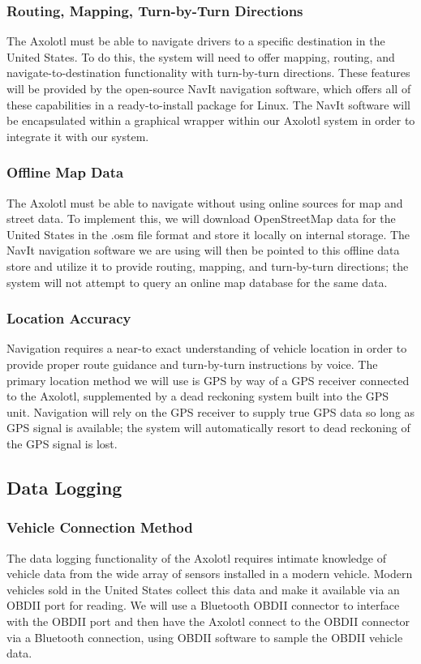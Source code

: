 \documentclass[onecolumn, draftclsnofoot,10pt, compsoc]{IEEEtran}
\begin{document}
\subsubsection{Routing, Mapping, Turn-by-Turn Directions}
The Axolotl must be able to navigate drivers to a specific destination in the United States. To do this, the system will need to offer mapping, routing, and navigate-to-destination functionality with turn-by-turn directions. These features will be provided by the open-source NavIt navigation software, which offers all of these capabilities in a ready-to-install package for Linux. The NavIt software will be encapsulated within a graphical wrapper within our Axolotl system in order to integrate it with our system.

\subsubsection{Offline Map Data}
The Axolotl must be able to navigate without using online sources for map and street data. To implement this, we will download OpenStreetMap data for the United States in the .osm file format and store it locally on internal storage. The NavIt navigation software we are using will then be pointed to this offline data store and utilize it to provide routing, mapping, and turn-by-turn directions; the system will not attempt to query an online map database for the same data.

\subsubsection{Location Accuracy}
Navigation requires a near-to exact understanding of vehicle location in order to provide proper route guidance and turn-by-turn instructions by voice. The primary location method we will use is GPS by way of a GPS receiver connected to the Axolotl, supplemented by a dead reckoning system built into the GPS unit. Navigation will rely on the GPS receiver to supply true GPS data so long as GPS signal is available; the system will automatically resort to dead reckoning of the GPS signal is lost.

\subsection{Data Logging}
\subsubsection{Vehicle Connection Method}
The data logging functionality of the Axolotl requires intimate knowledge of vehicle data from the wide array of sensors installed in a modern vehicle. Modern vehicles sold in the United States collect this data and make it available via an OBDII port for reading. We will use a Bluetooth OBDII connector to interface with the OBDII port and then have the Axolotl connect to the OBDII connector via a Bluetooth connection, using OBDII software to sample the OBDII vehicle data.
\end{document}
